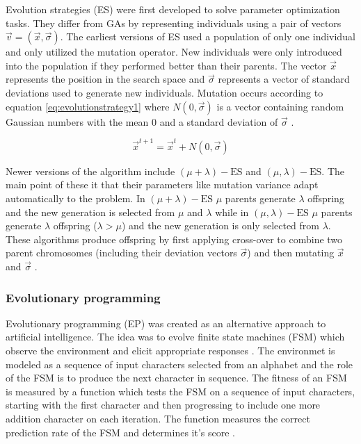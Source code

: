 Evolution strategies (ES) were first developed to solve parameter optimization tasks. They differ from GAs by representing individuals using a pair of vectors $\vec{v} = (\vec{x},\vec{\sigma})$. The earliest versions of ES used a population of only one individual and only utilized the mutation operator. New individuals were only introduced into the population if they performed better than their parents. The vector $\vec{x}$ represents the position in the search space and $\vec{\sigma}$ represents a vector of standard deviations used to generate new individuals. Mutation occurs according to equation \ref{eq:evolutionstrategy1} where $N(0,\vec{\sigma})$ is a vector containing random Gaussian numbers with the mean $0$ and a standard deviation of $\vec{\sigma}$ \cite{Michalewicz1997}.

\begin{equation}
  \vec{x}^{t+1} =  \vec{x}^{t} + N(0,\vec{\sigma})
  \label{eq:evolutionstrategy1}
\end{equation}

Newer versions of the algorithm include $(\mu + \lambda)-\text{ES}$ and $(\mu,\lambda)-\text{ES}$. The main point of these it that their parameters like mutation variance adapt automatically to the problem. In $(\mu + \lambda)-\text{ES}$ $\mu$ parents generate $\lambda$ offspring and the new generation is selected from $\mu$ and $\lambda$ while in $(\mu,\lambda)-\text{ES}$ $\mu$ parents generate $\lambda$ offspring ($\lambda > \mu$) and the new generation is only selected from $\lambda$. These algorithms produce offspring by first applying cross-over to combine two parent chromosomes (including their deviation vectors $\vec{\sigma}$) and then mutating $\vec{x}$ and $\vec{\sigma}$ \cite{Michalewicz1997}.

\subsubsection{Evolutionary programming}

Evolutionary programming (EP) was created as an alternative approach to artificial intelligence. The idea was to evolve finite state machines (FSM) which observe the environment and elicit appropriate responses \cite{Fogel1996}. The environmet is modeled as a sequence of input characters selected from an alphabet and the role of the FSM is to produce the next character in sequence. The fitness of an FSM is measured by a function which tests the FSM on a sequence of input characters, starting with the first character and then progressing to include one more addition character on each iteration. The function measures the correct prediction rate of the FSM and determines it's score \cite{Michalewicz1997}.

